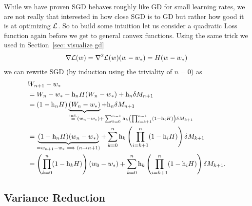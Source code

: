 While we have proven SGD behaves roughly like GD for small learning rates, we
are not really that interested in how close SGD is to GD but rather how good it
is at optimizing \(\mathcal{L}\). So to build some intuition let us consider a
quadratic Loss function again before we get to general convex functions.
Using the same trick we used in Section~\ref{sec: visualize gd} 
\begin{align*}
	\nabla\mathcal{L}(w)
	= \nabla^2\mathcal{L}(w)(w-w_*)
	= H(w-w_*)
\end{align*}
we can rewrite SGD (by induction using the triviality of \(n=0\)) as
\begin{align}
	\nonumber
	&\Weights_{n+1}-\minimum\\
	\nonumber
	&= \Weights_n - \minimum - \lr_n H(\Weights_n-\minimum) + \lr_n\martIncr_{n+1}\\
	\nonumber
	&=(1-\lr_n H)\underbrace{(\Weights_n - \minimum)}_{
		\xeq{\text{ind.}} (\weights_n - \minimum)
		\mathrlap{+ \sum_{k=0}^{n-1}\lr_k\left(\prod_{i=k+1}^{n-1}(1-\lr_iH)\right)\martIncr_{k+1}}
	} + \lr_n\martIncr_{n+1}\\
	\nonumber
	&= \underbrace{(1-\lr_n H)(\weights_n - \minimum)}_{=\weights_{n+1}-\minimum \implies (n\to n+1)}
	+ \sum_{k=0}^n\lr_k\left(\prod_{i=k+1}^n(1-\lr_iH)\right)\martIncr_{k+1}\\
	\label{eq: unrolled SGD weights (general quadratic loss case)}
	&=\left(\prod_{k=0}^n(1-\lr_kH)\right)(\weights_0-\minimum)
	+ \sum_{k=0}^n\lr_k\left(\prod_{i=k+1}^n(1-\lr_iH)\right)\martIncr_{k+1}.
\end{align}

\subsection{Variance Reduction}\label{subsec: variance reduction}

